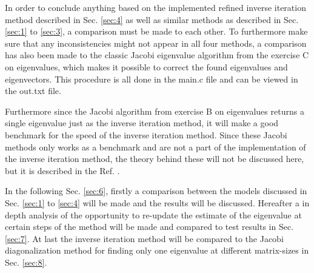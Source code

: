 \documentclass[twocolumn]{article}
\begin{document}
In order to conclude anything based on the implemented refined inverse iteration method described in Sec. \ref{sec:4} as well as similar methods as described in Sec. \ref{sec:1} to \ref{sec:3}, a comparison must be made to each other. To furthermore make sure that any inconsistencies might not appear in all four methods, a comparison has also been made to the classic Jacobi eigenvalue algorithm from the exercise C on eigenvalues, which makes it possible to correct the found eigenvalues and eigenvectors. This procedure is all done in the main.c file and can be viewed in the out.txt file.


Furthermore since the Jacobi algorithm from exercise B on eigenvalues returns a single eigenvalue just as the inverse iteration method, it will make a good benchmark for the speed of the inverse iteration method.  Since these Jacobi methods only works as a benchmark and are not a part of the implementation of the inverse iteration method, the theory behind these will not be discussed here, but it is described in the Ref. \cite[Chapter 3 - Eigenvalues and eigenvectors]{Dmi}.

In the following Sec. \ref{sec:6}, firstly a comparison between the models discussed in Sec. \ref{sec:1} to \ref{sec:4} will be made and the results will be discussed. Hereafter a in depth analysis of the opportunity to re-update the estimate of the eigenvalue at certain steps of the method will be made and compared to test results in Sec. \ref{sec:7}. At last the inverse iteration method will be compared to the Jacobi diagonalization method for finding only one eigenvalue at different matrix-sizes in Sec. \ref{sec:8}.
\end{document}
